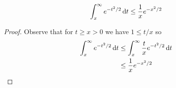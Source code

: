 
\begin{prop}
  \[ \int_x^\infty e^{-t^2/2} \dif t \leq \frac{1}{x} e^{-x^2/2} \]
\end{prop}

\begin{proof}
  Observe that for $t \geq x > 0$ we have $1 \leq t/x$ so
  \begin{align*}
    \int_x^\infty e^{-t^2/2} \dif t
    &\leq \int_x^\infty \frac{t}{x} e^{-t^2/2} \dif t
    \\ &\leq \frac{1}{x} e^{-x^2/2}
  \end{align*}
\end{proof}
